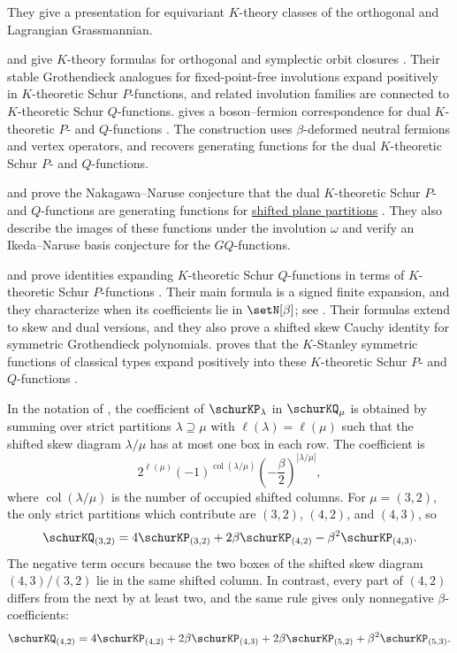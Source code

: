They give a presentation for equivariant $K$-theory classes of the orthogonal and Lagrangian Grassmannian.

 and  give $K$-theory formulas
for orthogonal and symplectic orbit closures \cite{MarbergPawlowski2020}.
Their stable Grothendieck analogues for fixed-point-free involutions expand
positively in $K$-theoretic Schur $P$-functions, and related involution
families are connected to $K$-theoretic Schur $Q$-functions.
 gives a boson--fermion correspondence for dual
$K$-theoretic $P$- and $Q$-functions \cite{Iwao2027}.  The construction uses
$\beta$-deformed neutral fermions and vertex operators, and recovers generating
functions for the dual $K$-theoretic Schur $P$- and $Q$-functions.

 and  prove the Nakagawa--Naruse
conjecture that the dual $K$-theoretic Schur $P$- and $Q$-functions are
generating functions for \hyperref[planePartitions]{shifted plane partitions}
\cite{LewisMarberg2024}.
They also describe the images of these functions under the involution $\omega$
and verify an Ikeda--Naruse basis conjecture for the $GQ$-functions.

 and  prove identities expanding
$K$-theoretic Schur $Q$-functions in terms of $K$-theoretic Schur
$P$-functions \cite{ChiuMarberg2024}.  Their main formula is a signed finite
expansion, and they characterize when its coefficients lie in
$\setN[\beta]$; see \cite[Thm.~1.1 and Cor.~1.2]{ChiuMarberg2024}.  Their
formulas extend to skew and dual versions, and they also prove a shifted skew
Cauchy identity for symmetric Grothendieck polynomials.
 proves that the $K$-Stanley symmetric functions of
classical types expand positively into these $K$-theoretic Schur $P$- and
$Q$-functions \cite{Marberg2025x}.

\begin{example*}[A $Q$-to-$P$ expansion]
In the notation of \cite[Thm.~1.1]{ChiuMarberg2024}, the coefficient of
$\schurKP_\lambda$ in $\schurKQ_\mu$ is obtained by summing over strict
partitions $\lambda \supseteq \mu$ with $\ell(\lambda)=\ell(\mu)$ such that
the shifted skew diagram $\lambda/\mu$ has at most one box in each row.
The coefficient is
\[
  2^{\ell(\mu)}(-1)^{\operatorname{col}(\lambda/\mu)}
  \left(-\frac{\beta}{2}\right)^{|\lambda/\mu|},
\]
where $\operatorname{col}(\lambda/\mu)$ is the number of occupied shifted
columns.  For $\mu=(3,2)$, the only strict partitions which contribute are
$(3,2)$, $(4,2)$, and $(4,3)$, so
\[
  \schurKQ_{(3,2)}
  =4\schurKP_{(3,2)}
   +2\beta\schurKP_{(4,2)}
   -\beta^2\schurKP_{(4,3)}.
\]
The negative term occurs because the two boxes of the shifted skew diagram
$(4,3)/(3,2)$ lie in the same shifted column.  In contrast, every part of
$(4,2)$ differs from the next by at least two, and the same rule gives only
nonnegative $\beta$-coefficients:
\[
  \schurKQ_{(4,2)}
  =4\schurKP_{(4,2)}
   +2\beta\schurKP_{(4,3)}
   +2\beta\schurKP_{(5,2)}
   +\beta^2\schurKP_{(5,3)}.
\]
\end{example*}

